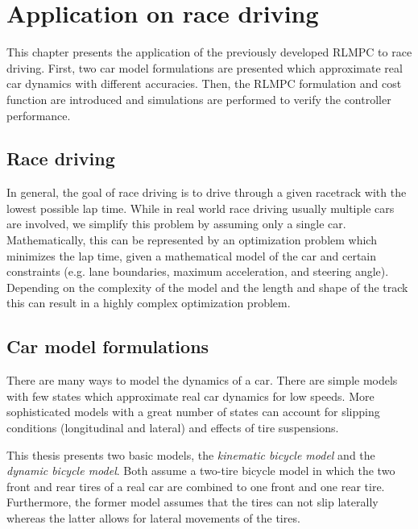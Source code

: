 \chapter{Application on race driving}
This chapter presents the application of the previously developed RLMPC to race driving. First, two car model formulations are presented which approximate real car dynamics with different accuracies. Then, the RLMPC formulation and cost function are introduced and simulations are performed to verify the controller performance.

\section{Race driving}
In general, the goal of race driving is to drive through a given racetrack with the lowest possible lap time. While in real world race driving usually multiple cars are involved, we simplify this problem by assuming only a single car. Mathematically, this can be represented by an optimization problem which minimizes the lap time, given a mathematical model of the car and certain constraints (e.g. lane boundaries, maximum acceleration, and steering angle). Depending on the complexity of the model and the length and shape of the track this can result in a highly complex optimization problem.

\section{Car model formulations}
There are many ways to model the dynamics of a car. There are simple models with few states which approximate real car dynamics for low speeds. More sophisticated models with a great number of states can account for slipping conditions (longitudinal and lateral) and effects of tire suspensions.

This thesis presents two basic models, the \emph{kinematic bicycle model} and the \emph{dynamic bicycle model}. Both assume a two-tire bicycle model in which the two front and rear tires of a real car are combined to one front and one rear tire. Furthermore, the former model assumes that the tires can not slip laterally whereas the latter allows for lateral movements of the tires.

